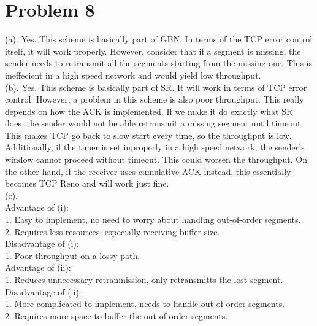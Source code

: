 \documentclass[titlepage, paper=a4, fontsize=11pt]{scrartcl} %
\numberwithin{equation}{section} %
\numberwithin{table}{section} %
\begin{document}

\section*{Problem 8}
(a).
Yes. This scheme is basically part of GBN. In terms of the TCP error control itself, it will work properly. However, consider that if a segment is missing, the sender needs to retransmit all the segments starting from the missing one. This is ineffecient in a high speed network and would yield low throughput. \\

(b).
Yes. This scheme is basically part of SR. It will work in terms of TCP error control. However, a problem in this scheme is also poor throughput. This really depends on how the ACK is implemented. If we make it do exactly what SR does, the sender would not be able retransmit a missing segment until timeout. This makes TCP go back to slow start every time, so the throughput is low. Additionally, if the timer is set inproperly in a high speed network, the sender's window cannot proceed without timeout. This could worsen the throughput. On the other hand, if the receiver uses cumulative ACK instead, this essentially becomes TCP Reno and will work just fine. \\

(c). \\
Advantage of (i): \\
1. Easy to implement, no need to worry about handling out-of-order segments. \\
2. Requires less resources, especially receiving buffer size. \\
Disadvantage of (i): \\
1. Poor throughput on a lossy path. \\

Advantage of (ii): \\
1. Reduces unnecessary retranmission, only retransmitts the lost segment. \\
Disadvantage of (ii): \\
1. More complicated to implement, needs to handle out-of-order segments. \\
2. Requires more space to buffer the out-of-order segments. \\
\end{document}
